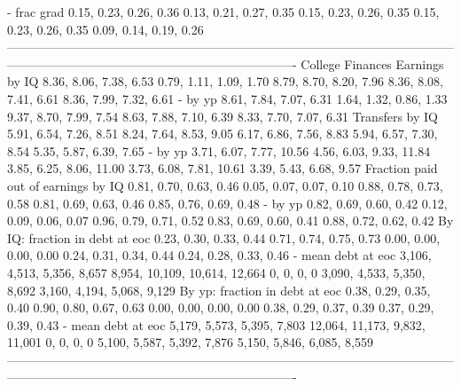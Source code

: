                            - frac grad      0.15, 0.23, 0.26, 0.36         0.13, 0.21, 0.27, 0.35   0.15, 0.23, 0.26, 0.35      0.15, 0.23, 0.26, 0.35      0.09, 0.14, 0.19, 0.26
----------------------------------------------------------------------------------------------------------------------------------------------------------------------------------
                      College Finances                                                                                                                                            
                        Earnings by IQ      8.36, 8.06, 7.38, 6.53         0.79, 1.11, 1.09, 1.70   8.79, 8.70, 8.20, 7.96      8.36, 8.08, 7.41, 6.61      8.36, 7.99, 7.32, 6.61
                               - by yp      8.61, 7.84, 7.07, 6.31         1.64, 1.32, 0.86, 1.33   9.37, 8.70, 7.99, 7.54      8.63, 7.88, 7.10, 6.39      8.33, 7.70, 7.07, 6.31
                       Transfers by IQ      5.91, 6.54, 7.26, 8.51         8.24, 7.64, 8.53, 9.05   6.17, 6.86, 7.56, 8.83      5.94, 6.57, 7.30, 8.54      5.35, 5.87, 6.39, 7.65
                               - by yp     3.71, 6.07, 7.77, 10.56        4.56, 6.03, 9.33, 11.84  3.85, 6.25, 8.06, 11.00     3.73, 6.08, 7.81, 10.61      3.39, 5.43, 6.68, 9.57
   Fraction paid out of earnings by IQ      0.81, 0.70, 0.63, 0.46         0.05, 0.07, 0.07, 0.10   0.88, 0.78, 0.73, 0.58      0.81, 0.69, 0.63, 0.46      0.85, 0.76, 0.69, 0.48
                               - by yp      0.82, 0.69, 0.60, 0.42         0.12, 0.09, 0.06, 0.07   0.96, 0.79, 0.71, 0.52      0.83, 0.69, 0.60, 0.41      0.88, 0.72, 0.62, 0.42
        By IQ: fraction in debt at eoc      0.23, 0.30, 0.33, 0.44         0.71, 0.74, 0.75, 0.73   0.00, 0.00, 0.00, 0.00      0.24, 0.31, 0.34, 0.44      0.24, 0.28, 0.33, 0.46
                    - mean debt at eoc  3,106, 4,513, 5,356, 8,657  8,954, 10,109, 10,614, 12,664               0, 0, 0, 0  3,090, 4,533, 5,350, 8,692  3,160, 4,194, 5,068, 9,129
        By yp: fraction in debt at eoc      0.38, 0.29, 0.35, 0.40         0.90, 0.80, 0.67, 0.63   0.00, 0.00, 0.00, 0.00      0.38, 0.29, 0.37, 0.39      0.37, 0.29, 0.39, 0.43
                    - mean debt at eoc  5,179, 5,573, 5,395, 7,803  12,064, 11,173, 9,832, 11,001               0, 0, 0, 0  5,100, 5,587, 5,392, 7,876  5,150, 5,846, 6,085, 8,559
----------------------------------------------------------------------------------------------------------------------------------------------------------------------------------

